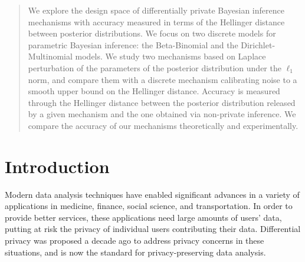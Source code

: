 \documentclass{article}
\begin{document}
\begin{abstract}
We explore the design space of differentially private Bayesian
inference mechanisms with accuracy measured in terms of the Hellinger
distance between posterior distributions.  
We focus on two discrete models for parametric Bayesian
inference: the Beta-Binomial and the Dirichlet-Multinomial
models. We study two mechanisms based on 
Laplace perturbation of the parameters of the posterior distribution under the
$\ell_1$ norm, and compare them with a discrete mechanism
calibrating noise to a smooth upper bound on the Hellinger distance.
Accuracy is measured through the Hellinger distance between the posterior
distribution released by a given mechanism and the one obtained via non-private inference.
We compare the accuracy of our mechanisms theoretically and experimentally.
\end{abstract}





\section{Introduction}
\label{sec_intro}
Modern data analysis techniques have enabled significant advances in a
variety of applications in medicine, finance, social science, and transportation.
In order to provide better services, these applications need large amounts of users' data,
putting at risk the privacy of individual users contributing their data. 
Differential privacy was proposed a decade ago to address privacy concerns
in these situations, and is now the standard for privacy-preserving data analysis.
\end{document}
